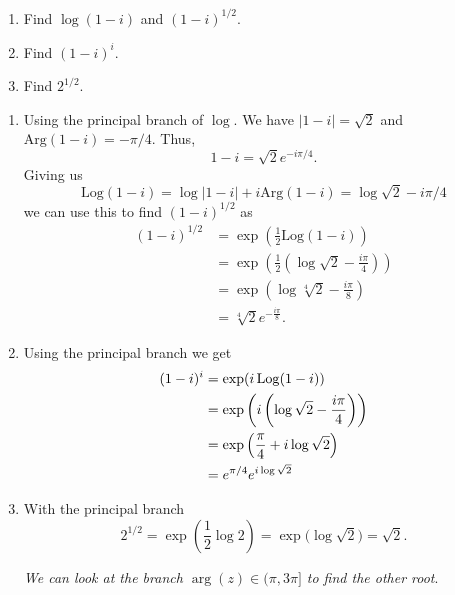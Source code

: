 \documentclass[10pt, a4paper]{article}
\begin{document}
\begin{example}
    \begin{enumerate}[label = (\alph*)]
        \item Find $\log(1 - i)$ and $(1 - i) ^ {1 / 2}$.

        \item Find $(1 - i) ^ i$.

        \item Find $2 ^ {1 / 2}$.
    \end{enumerate}

    \begin{solution}
        \begin{enumerate}[label = (\alph*)]
            \item Using the principal branch of $\log$.
            We have $|1 - i| = \sqrt{2}$ and $\mathrm{Arg}(1 - i) = -\pi / 4$.
            Thus,
            \[
            1 - i = \sqrt{2}e ^ {-i\pi / 4}.
            \]
            Giving us
            \[
            \mathrm{Log}(1 - i) = \log{|1 - i|} + i\mathrm{Arg}(1 - i) = \log{\sqrt{2}} - i\pi / 4
            \]
            we can use this to find $(1 - i) ^ {1 / 2}$ as
            \begin{align*}
                (1 - i) ^ {1 / 2} &= \exp\left(\frac{1}{2}\mathrm{Log}(1 - i)\right) \\
                &= \exp\left(\frac{1}{2}\left(\log{\sqrt{2}} - \frac{i\pi}{4}\right)\right) \\
                &= \exp\left(\log{\sqrt[4]{2}} - \frac{i\pi}{8}\right) \\
                &= \sqrt[4]{2}e ^ {-\frac{i\pi}{8}}.
            \end{align*}

            \item Using the principal branch we get
            \begin{align*}
                (1 - i) ^ i &= \exp(i\operatorname{Log}(1 - i)) \\
                &= \exp\left(i\left(\log{\sqrt{2}} - \frac{i\pi}{4}\right)\right) \\
                &= \exp\left(\frac{\pi}{4} + i\log{\sqrt{2}}\right) \\
                &= e ^ {\pi / 4}e ^ {i\log{\sqrt{2}}}
            \end{align*}

            \item With the principal branch
            \[
            2 ^ {1 / 2} = \exp\left(\frac{1}{2}\log{2}\right) = \exp(\log{\sqrt{2}) = \sqrt{2}}.
            \]

            \textit{We can look at the branch $\arg(z) \in (\pi, 3\pi]$ to find the other root}.
        \end{enumerate}
    \end{solution}
\end{example}
\end{document}
